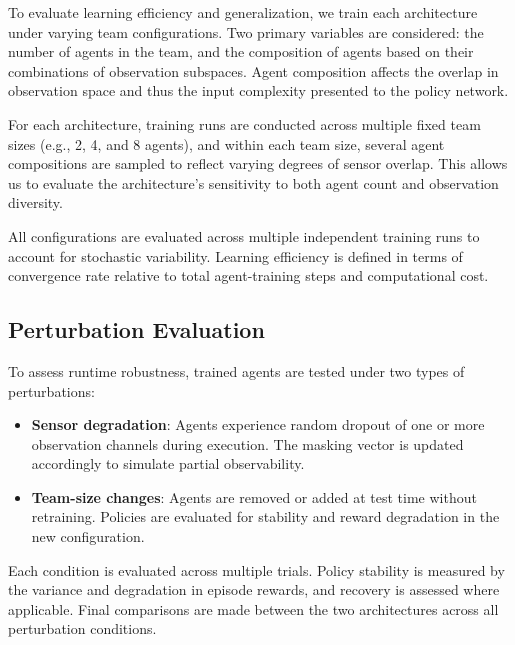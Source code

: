 To evaluate learning efficiency and generalization, 
we train each architecture under varying team configurations. 
Two primary variables are considered: the number of agents in the team, 
and the composition of agents based on their combinations of observation subspaces. 
Agent composition affects the overlap in observation space and thus 
the input complexity presented to the policy network. 

For each architecture, training runs are conducted across multiple 
fixed team sizes (e.g., 2, 4, and 8 agents), and within each team size, 
several agent compositions are sampled to reflect varying degrees of sensor overlap. 
This allows us to evaluate the architecture's sensitivity to 
both agent count and observation diversity.

All configurations are evaluated across multiple independent 
training runs to account for stochastic variability.
Learning efficiency is defined in terms of convergence rate 
relative to total agent-training steps and computational cost.

\subsection{Perturbation Evaluation}

To assess runtime robustness, trained agents are tested under two types of perturbations:

\begin{itemize}
    \item \textbf{Sensor degradation}: Agents experience random dropout 
        of one or more observation channels during execution. 
        The masking vector is updated accordingly to simulate partial observability.
    \item \textbf{Team-size changes}: Agents are removed or added at test 
        time without retraining. Policies are evaluated for stability and 
        reward degradation in the new configuration.
\end{itemize}

Each condition is evaluated across multiple trials. 
Policy stability is measured by the variance and degradation in episode rewards, 
and recovery is assessed where applicable. 
Final comparisons are made between the two architectures across all perturbation conditions.


